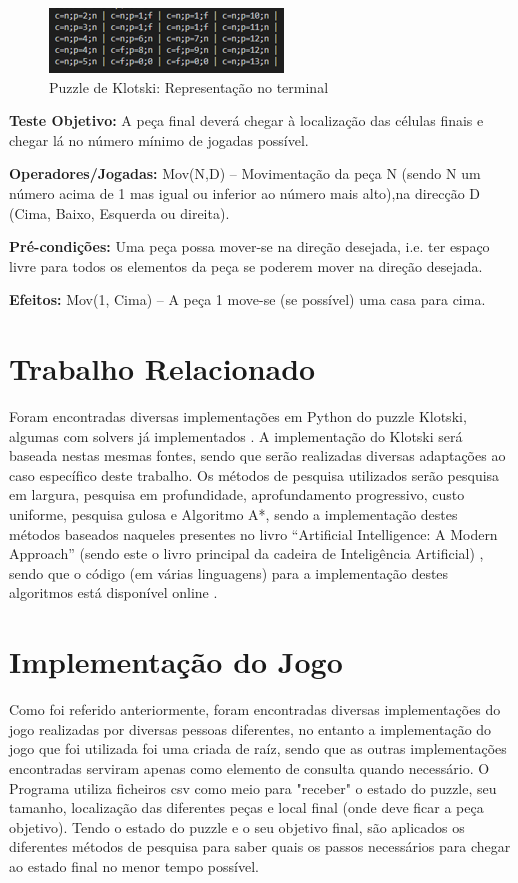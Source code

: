 \documentclass[conference]{IEEEtran}
\begin{document}
\begin{figure}
	\centering
	\includegraphics[width=0.75\linewidth]{klotski3.png}
	\caption{Puzzle de Klotski: Representação no terminal}
	\label{fig:klotski3}
\end{figure}

\textbf{Teste Objetivo:} A peça final deverá chegar à localização das células finais e chegar lá no número mínimo de jogadas possível.

\textbf{Operadores/Jogadas:} Mov(N,D) – Movimentação da peça N (sendo N um número acima de 1 mas igual ou inferior ao número mais alto),na direcção D (Cima, Baixo, Esquerda ou direita).

\textbf{Pré-condições:} Uma peça possa mover-se na direção desejada, i.e. ter espaço livre para todos os elementos da peça se poderem mover na direção desejada.

\textbf{Efeitos:} Mov(1, Cima) – A peça 1 move-se (se possível) uma casa para cima.



\section{Trabalho Relacionado}
Foram encontradas diversas implementações em Python do puzzle Klotski, algumas com solvers já implementados \cite{b3} \cite{b4} \cite{b5} \cite{b6} \cite{b7}. A implementação do Klotski será baseada nestas mesmas fontes, sendo que serão realizadas diversas adaptações ao caso específico deste trabalho.
Os métodos de pesquisa utilizados serão pesquisa em largura, pesquisa em profundidade, aprofundamento progressivo, custo uniforme, pesquisa gulosa e Algoritmo A*, sendo a implementação destes métodos baseados naqueles presentes no livro “Artificial Intelligence: A Modern Approach” (sendo este o livro principal da cadeira de Inteligência Artificial) \cite{b8}, sendo que o código (em várias linguagens) para a implementação destes algoritmos está disponível online \cite{b9}.

\section{Implementação do Jogo}
Como foi referido anteriormente, foram encontradas diversas implementações do jogo realizadas por diversas pessoas diferentes, no entanto a implementação do jogo que foi utilizada foi uma criada de raíz, sendo que as outras implementações encontradas serviram apenas como elemento de consulta quando necessário.
O Programa utiliza ficheiros csv como meio para "receber" o estado do puzzle, seu tamanho, localização das diferentes peças e local final (onde deve ficar a peça objetivo).
Tendo o estado do puzzle e o seu objetivo final, são aplicados os diferentes métodos de pesquisa para saber quais os passos necessários para chegar ao estado final no menor tempo possível.
\end{document}
